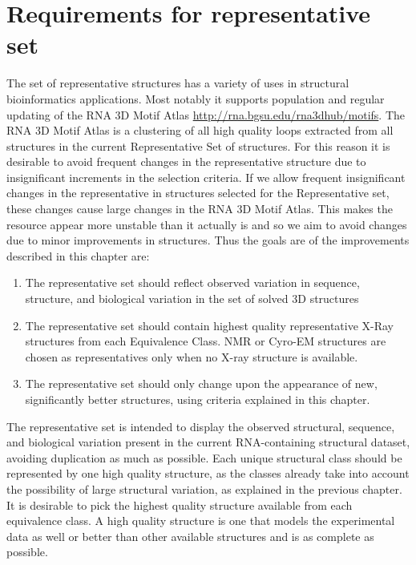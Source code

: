 \section{Requirements for representative set}

The set of representative structures has a variety of uses in structural
bioinformatics applications. Most notably it supports population and regular
updating of the RNA 3D Motif Atlas \url{http://rna.bgsu.edu/rna3dhub/motifs}.
The RNA 3D Motif Atlas is a clustering of all high quality loops extracted from
all structures in the current Representative Set of structures. For this reason
it is desirable to avoid frequent changes in the representative structure due to
insignificant increments in the selection criteria. If we allow frequent
insignificant changes in the representative in structures selected for the
Representative set, these changes cause large changes in the RNA 3D Motif Atlas.
This makes the resource appear more unstable than it actually is and so we aim
to avoid changes due to minor improvements in structures. Thus the goals are of
the improvements described in this chapter are:

\begin{enumerate}
  \item The representative set should reflect observed variation in sequence,
    structure, and biological variation in the set of solved 3D structures

  \item The representative set should contain highest quality representative
    X-Ray structures from each Equivalence Class. NMR or Cyro-EM structures are
    chosen as representatives only when no X-ray structure is available.

  \item The representative set should only change upon the appearance of new,
    significantly better structures, using criteria explained in this chapter.
\end{enumerate}

The representative set is intended to display the observed structural, sequence,
and biological variation present in the current RNA-containing structural
dataset, avoiding duplication as much as possible. Each unique structural class
should be represented by one high quality structure, as the classes already take
into account the possibility of large structural variation, as explained in the
previous chapter. It is desirable to pick the highest quality structure
available from each equivalence class. A high quality structure is one that
models the experimental data as well or better than other available structures
and is as complete as possible.

